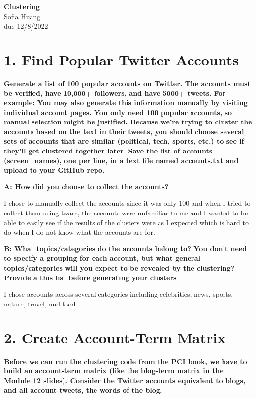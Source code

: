 \documentclass[12pt]{article}
\begin{document}
\begin{centering}
{\large\textbf{Clustering}}\\ 
Sofia Huang\\
due 12/8/2022\\
\end{centering}


\section*{1. Find Popular Twitter Accounts}
\noindent \textbf{Generate a list of 100 popular accounts on Twitter. The accounts must be verified, have 10,000+ followers, and have 5000+ tweets. For example:
You may also generate this information manually by visiting individual account pages. You only need 100 popular accounts, so manual selection might be justified.
Because we're trying to cluster the accounts based on the text in their tweets, you should choose several sets of accounts that are similar (political, tech, sports, etc.) to see if they'll get clustered together later.
Save the list of accounts (screen\_names), one per line, in a text file named accounts.txt and upload to your GitHub repo.}

\noindent\textbf{A: How did you choose to collect the accounts?}

I chose to manually collect the accounts since it was only 100 and when I tried to collect them using twarc, the accounts were unfamiliar to me and I wanted to be able to easily see if the results of the clusters were as I expected which is hard to do when I do not know what the accounts are for. 

\noindent\textbf{B: What topics/categories do the accounts belong to? You don't need to specify a grouping for each account, but what general topics/categories will you expect to be revealed by the clustering? Provide a this list before generating your clusters}

I chose accounts across several categories including celebrities, news, sports, nature, travel, and food.

\section*{2. Create Account-Term Matrix}
\noindent \textbf{Before we can run the clustering code from the PCI book, we have to build an account-term matrix (like the blog-term matrix in the Module 12 slides). Consider the Twitter accounts equivalent to blogs, and all account tweets, the words of the blog.}
\end{document}
